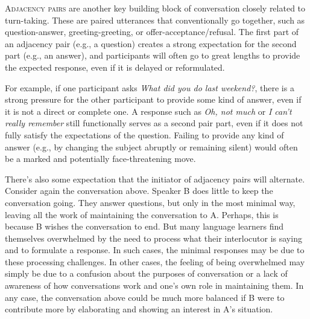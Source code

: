 \textsc{Adjacency pairs} are another key building block of conversation closely related to turn-taking. These are paired utterances that conventionally go together, such as question-answer, greeting-greeting, or offer-acceptance/refusal. The first part of an adjacency pair (e.g., a question) creates a strong expectation for the second part (e.g., an answer), and participants will often go to great lengths to provide the expected response, even if it is delayed or reformulated.

For example, if one participant asks \textit{What did you do last weekend?}, there is a strong pressure for the other participant to provide some kind of answer, even if it is not a direct or complete one. A response such as \textit{Oh, not much} or \textit{I can't really remember} still functionally serves as a second pair part, even if it does not fully satisfy the expectations of the question. Failing to provide any kind of answer (e.g., by changing the subject abruptly or remaining silent) would often be a marked and potentially face-threatening move.

There's also some expectation that the initiator of adjacency pairs will alternate. Consider again the conversation above. Speaker B does little to keep the conversation going. They answer questions, but only in the most minimal way, leaving all the work of maintaining the conversation to A. Perhaps, this is because B wishes the conversation to end. But many language learners find themselves overwhelmed by the need to process what their interlocutor is saying and to formulate a response. In such cases, the minimal responses may be due to these processing challenges. In other cases, the feeling of being overwhelmed may simply be due to a confusion about the purposes of conversation or a lack of awareness of how conversations work and one's own role in maintaining them. In any case, the conversation above could be much more balanced if B were to contribute more by elaborating and showing an interest in A's situation.

